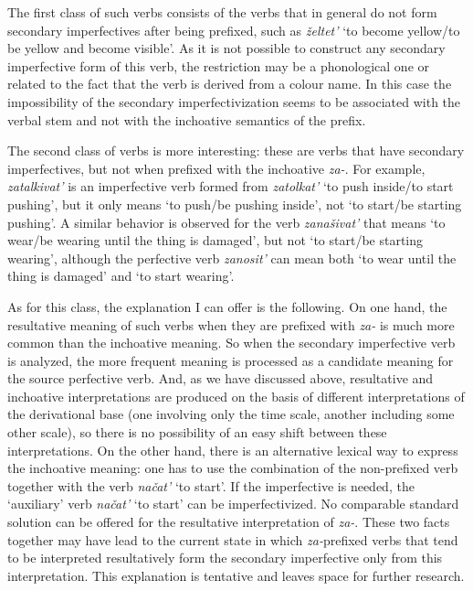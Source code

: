 The first class of such verbs consists of the verbs that in general do not form secondary imperfectives after being prefixed, such as \textit{\v{z}eltet'} `to become yellow/to be yellow and become visible'. As it is not possible to construct any secondary imperfective form of this verb, the restriction may be a phonological one or related to the fact that the verb is derived from a colour name. In this case the impossibility of the secondary imperfectivization seems to be associated with the verbal stem and not with the inchoative semantics of the prefix. 

The second class of verbs is more interesting: these are verbs that have secondary imperfectives, but not when prefixed with the inchoative \textit{za-}. For example, \textit{zatalkivat'} is an imperfective verb formed from \textit{zatolkat'} `to push inside/to start pushing', but it only means `to push/be pushing inside', not `to start/be starting pushing'. A similar behavior is observed for the verb \textit{zana\v{s}ivat'} that means `to wear/be wearing until the thing is damaged', but not `to start/be starting wearing', although the perfective verb \textit{zanosit'} can mean both `to wear until the thing is damaged' and `to start wearing'.

As for this class, the explanation I can offer is the following. On one hand, the resultative meaning of such verbs when they are prefixed with \textit{za-} is much more common than the inchoative meaning. So when the secondary imperfective verb is analyzed, the more frequent meaning is processed as a candidate meaning for the source perfective verb. And, as we have discussed above, resultative and inchoative interpretations are produced on the basis of different interpretations of the derivational base (one involving only the time scale, another including some other scale), so there is no possibility of an easy shift between these interpretations. On the other hand, there is an alternative lexical way to express the inchoative meaning: one has to use the combination of the non-prefixed verb together with the verb \textit{na\v{c}at'} `to start'. If the imperfective is needed, the `auxiliary' verb \textit{na\v{c}at'} `to start' can be imperfectivized. No comparable standard solution can be offered for the resultative interpretation of \textit{za-}. These two facts together may have lead to the current state in which \textit{za-}prefixed verbs that tend to be interpreted resultatively form the secondary imperfective only from this interpretation. This explanation is tentative and leaves space for further research.

